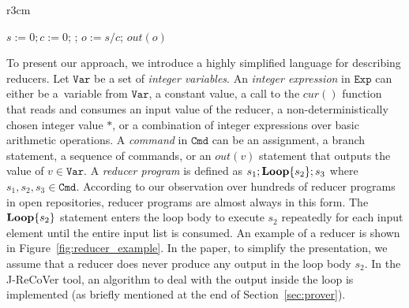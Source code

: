 \documentclass{llncs}
\newcommand{\Var}{\mathtt{Var}}
\newcommand{\Exp}{\mathtt{Exp}}
\newcommand{\Cmd}{\mathtt{Cmd}}
\newcommand{\cur}{cur()}
\newcommand{\rloop}{
	\ifmmode
	\mathbf{Loop}
	\else
	\textbf{Loop}
	\fi}
\begin{document}
\begin{wrapfigure}{r}{3cm}
		\vspace{-0.8cm}

	
	\begin{minipage}{0.3\textwidth}
		\begin{algorithm}[H]
			$s := 0;c:=0$; \;
			\Loop{}{
				$s := s+\cur$;\;
				$c := c+1$
			};
			$o := s/c$;\;
			$out(o)$\;
		\end{algorithm}
	\end{minipage}


	\caption{A reducer that computes the average value.}
	\vspace{-0.8cm}
	\label{fig:reducer_example}
\end{wrapfigure}

%
To present our approach, we introduce a highly simplified language
for describing reducers. 
%
Let $\Var$ be a set of
\emph{integer variables}. An \emph{integer expression} in $\Exp$ can either be
a~variable from $\Var$, a constant value, a call to the $\cur$ function that
reads and consumes an input value of the reducer, a non-deterministically chosen integer value $*$, or a combination of integer expressions over basic
arithmetic operations. A
\emph{command} in $\Cmd$ can be an assignment, a branch statement, a sequence of
commands, or an $out(v)$ statement that outputs the value of $v \in \Var$. A
\emph{reducer program} is defined as $s_1;\rloop\{s_2\};s_3$ where $s_1,s_2,s_3
\in \Cmd$. According to our observation over hundreds  of reducer programs in
open repositories, reducer programs are almost always in this form. The
$\rloop\{s_2\}$ statement enters the loop body to execute $s_2$ repeatedly for
each input element until the entire input list is consumed. An example of a
reducer is shown in Figure~\ref{fig:reducer_example}. In the paper, to simplify
the presentation, we assume that a reducer does never produce any output in the
loop body $s_2$. In the J-ReCoVer tool, an algorithm to deal with the output
inside the loop is implemented (as briefly mentioned at the end of
Section~\ref{sec:prover}).
\end{document}
